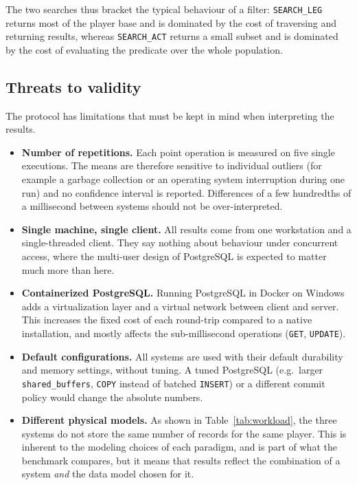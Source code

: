 \documentclass{article}
\begin{document}
The two searches thus bracket the typical behaviour of a filter: \texttt{SEARCH\_LEG} returns most of the player base and is dominated by the cost of traversing and returning results, whereas \texttt{SEARCH\_ACT} returns a small subset and is dominated by the cost of evaluating the predicate over the whole population.

\subsection{Threats to validity}
\label{subsec:validity}
The protocol has limitations that must be kept in mind when interpreting the results.
\begin{itemize}
    \item \textbf{Number of repetitions.} Each point operation is measured on five single executions. The means are therefore sensitive to individual outliers (for example a garbage collection or an operating system interruption during one run) and no confidence interval is reported. Differences of a few hundredths of a millisecond between systems should not be over-interpreted.
    \item \textbf{Single machine, single client.} All results come from one workstation and a single-threaded client. They say nothing about behaviour under concurrent access, where the multi-user design of PostgreSQL is expected to matter much more than here.
    \item \textbf{Containerized PostgreSQL.} Running PostgreSQL in Docker on Windows adds a virtualization layer and a virtual network between client and server. This increases the fixed cost of each round-trip compared to a native installation, and mostly affects the sub-millisecond operations (\texttt{GET}, \texttt{UPDATE}).
    \item \textbf{Default configurations.} All systems are used with their default durability and memory settings, without tuning. A tuned PostgreSQL (e.g.\ larger \texttt{shared\_buffers}, \texttt{COPY} instead of batched \texttt{INSERT}) or a different commit policy would change the absolute numbers.
    \item \textbf{Different physical models.} As shown in Table~\ref{tab:workload}, the three systems do not store the same number of records for the same player. This is inherent to the modeling choices of each paradigm, and is part of what the benchmark compares, but it means that results reflect the combination of a system \emph{and} the data model chosen for it.
\end{itemize}
\end{document}
